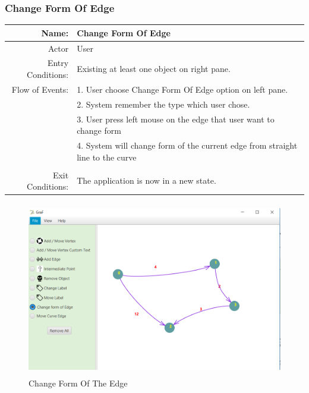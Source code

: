 \documentclass[a4paper,10pt]{article}
\begin{document}
\subsubsection{Change Form Of Edge}
	\begin{tabular}{|r|l|}
\hline
Name: & Change Form Of Edge \\
\hline
Actor & User \\
\hline
Entry Conditions: & Existing at least one object on right pane. \\
\hline
Flow of Events: & 1. User choose Change Form Of Edge option on left pane. \\
& 2. System remember the type which user chose.  \\
& 3. User press left mouse on the edge that user want to change form \\
& 4. System will change form of the current edge from straight line to the curve\\
\\
\hline
Exit Conditions: & The application is now in a new state. \\
\hline

\end{tabular}
\begin{figure}[H]
		\centering
		\includegraphics[height = 3in]{changeForm.png}
		\caption[Optional caption]{Change Form Of The Edge}
		\label{fig:Repository}
	\end{figure}
\paragraph{}
\end{document}
